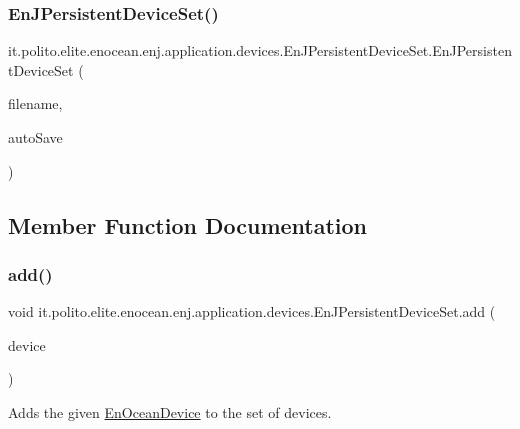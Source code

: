 \subsubsection{\texorpdfstring{En\+J\+Persistent\+Device\+Set()}{EnJPersistentDeviceSet()}\hspace{0.1cm}{\footnotesize\ttfamily [2/2]}}
{\footnotesize\ttfamily it.\+polito.\+elite.\+enocean.\+enj.\+application.\+devices.\+En\+J\+Persistent\+Device\+Set.\+En\+J\+Persistent\+Device\+Set (\begin{DoxyParamCaption}\item[{String}]{filename,  }\item[{boolean}]{auto\+Save }\end{DoxyParamCaption})}



\subsection{Member Function Documentation}
\hypertarget{classit_1_1polito_1_1elite_1_1enocean_1_1enj_1_1application_1_1devices_1_1_en_j_persistent_device_set_a7fe31fb9797352c0476ef5a8b8607f4b}{}\label{classit_1_1polito_1_1elite_1_1enocean_1_1enj_1_1application_1_1devices_1_1_en_j_persistent_device_set_a7fe31fb9797352c0476ef5a8b8607f4b} 
\subsubsection{\texorpdfstring{add()}{add()}}
{\footnotesize\ttfamily void it.\+polito.\+elite.\+enocean.\+enj.\+application.\+devices.\+En\+J\+Persistent\+Device\+Set.\+add (\begin{DoxyParamCaption}\item[{\hyperlink{classit_1_1polito_1_1elite_1_1enocean_1_1enj_1_1model_1_1_en_ocean_device}{En\+Ocean\+Device}}]{device }\end{DoxyParamCaption})}

Adds the given \hyperlink{}{En\+Ocean\+Device} to the set of devices.


